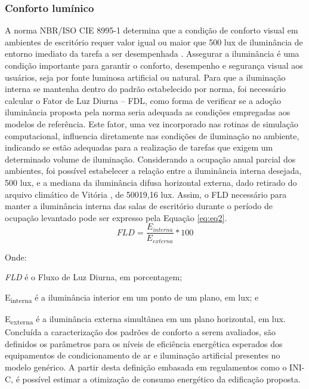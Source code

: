 \subsubsection{Conforto lumínico}
A norma NBR/ISO CIE 8995-1 \cite{AssociacaoBrasileiradeNormasTecnicas-ABNT2013} determina que a condição de conforto visual em ambientes de escritório requer valor igual ou maior que 500 lux de iluminância de entorno imediato da tarefa a ser desempenhada \cite{AssociacaoBrasileiradeNormasTecnicas-ABNT2013,Ramos2013}. Assegurar a iluminância é uma condição importante para garantir o conforto, desempenho e segurança visual aos usuários, seja por fonte luminosa artificial ou natural.\vspace*{0.3cm} \newline
Para que a iluminação interna se mantenha dentro do padrão estabelecido por norma, foi necessário calcular o Fator de Luz Diurna – FDL, como forma de verificar se a adoção iluminância proposta pela norma seria adequada as condições empregadas aos modelos de referência. Este fator, uma vez incorporado nas rotinas de simulação computacional, influencia diretamente nas condições de iluminação no ambiente, indicando se estão adequadas para a realização de tarefas que exigem um determinado volume de iluminação.\vspace*{0.3cm} \newline
Considerando a ocupação anual parcial dos ambientes, foi possível estabelecer a relação entre a iluminância interna desejada, 500 lux, e a mediana da iluminância difusa horizontal externa, dado retirado do arquivo climático de Vitória \cite{InstitutoNacionaldeMetrologiaNormalizacaoeQualidadeIndustrial-INMETRO2018}, de 50019,16 lux. Assim, o FLD necessário para manter a iluminância interna das salas de escritório durante o período de ocupação levantado pode ser expresso pela Equação \ref{eq:eq2}.
\begin{equation}\label{eq:eq2}
    FLD=\frac{E_{interna}}{E_{externa}}*100
\end{equation}

Onde:\par
\setlength\parindent{1.5cm} \textit{FLD} é o Fluxo de Luz Diurna, em porcentagem;\par
\setlength\parindent{1.5cm} E\textsubscript{interna} é a iluminância interior em um ponto de um plano, em lux; e\par
\setlength\parindent{1.5cm} E\textsubscript{externa} é a iluminância externa simultânea em um plano horizontal, em lux.\vspace*{0.3cm} \newline
\noindent Concluída a caracterização dos padrões de conforto a serem avaliados, são definidos os parâmetros para os níveis de eficiência energética esperados dos equipamentos de condicionamento de ar e iluminação artificial presentes no modelo genérico. A partir desta definição embasada em regulamentos como o INI-C, é possível estimar a otimização de consumo energético da edificação proposta.
